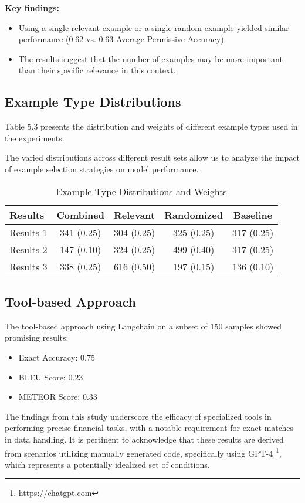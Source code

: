 \documentclass[logo,msc]{infthesis}           %
\begin{document}
\textbf{Key findings:}
\begin{itemize}
 \item Using a single relevant example or a single random example yielded similar performance (0.62 vs. 0.63 Average Permissive Accuracy).
 \item The results suggest that the number of examples may be more important than their specific relevance in this context.
\end{itemize}

\subsection{Example Type Distributions}
Table 5.3 presents the distribution and weights of different example types used in the experiments.

The varied distributions across different result sets allow us to analyze the impact of example selection strategies on model performance.
\begin{table}[h!]
\centering
\caption{Example Type Distributions and Weights}
\label{tab:example_weights}
\begin{tabular}{>{\raggedright}p{2.5cm}cccc}
\toprule
\textbf{Results} & \textbf{Combined} & \textbf{Relevant } & \textbf{Randomized} & \textbf{Baseline} \\
\midrule
Results 1 & 341 (0.25) & 304 (0.25) & 325 (0.25) & 317 (0.25) \\
Results 2 & 147 (0.10) & 324 (0.25) & 499 (0.40) & 317 (0.25) \\
Results 3 & 338 (0.25) & 616 (0.50) & 197 (0.15) & 136 (0.10) \\
\bottomrule
\end{tabular}
\end{table}

\subsection{Tool-based Approach}

The tool-based approach using Langchain on a subset of 150 samples showed promising results:
\begin{itemize}
   \item Exact Accuracy: 0.75
   \item BLEU Score: 0.23
   \item METEOR Score: 0.33
\end{itemize}
The findings from this study underscore the efficacy of specialized tools in performing precise financial tasks, with a notable requirement for exact matches in data handling. It is pertinent to acknowledge that these results are derived from scenarios utilizing manually generated code, specifically using GPT-4 \footnote{https://chatgpt.com}, which represents a potentially idealized set of conditions.
\end{document}
